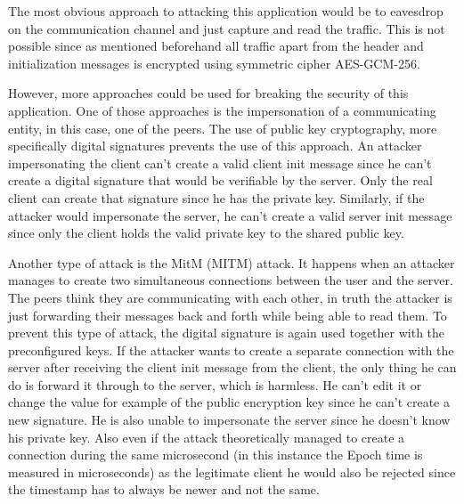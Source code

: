 The most obvious approach to attacking this application would be to eavesdrop on the communication channel and just capture and read the traffic. This is not possible since as mentioned beforehand all traffic apart from the header and initialization messages is encrypted using symmetric cipher AES-GCM-256.

However, more approaches could be used for breaking the security of this application. One of those approaches is the impersonation of a communicating entity, in this case, one of the peers. The use of public key cryptography, more specifically digital signatures prevents the use of this approach. An attacker impersonating the client can't create a valid client init message since he can't create a digital signature that would be verifiable by the server. Only the real client can create that signature since he has the private key. Similarly, if the attacker would impersonate the server, he can't create a valid server init message since only the client holds the valid private key to the shared public key.

Another type of attack is the MitM (\acl{MITM}) attack. It happens when an attacker manages to create two simultaneous connections between the user and the server. The peers think they are communicating with each other, in truth the attacker is just forwarding their messages back and forth while being able to read them. To prevent this type of attack, the digital signature is again used together with the preconfigured keys. If the attacker wants to create a separate connection with the server after receiving the client init message from the client, the only thing he can do is forward it through to the server, which is harmless. He can't edit it or change the value for example of the public encryption key since he can't create a new signature. He is also unable to impersonate the server since he doesn't know his private key. Also even if the attack theoretically managed to create a connection during the same microsecond (in this instance the Epoch time is measured in microseconds) as the legitimate client he would also be rejected since the timestamp has to always be newer and not the same.

